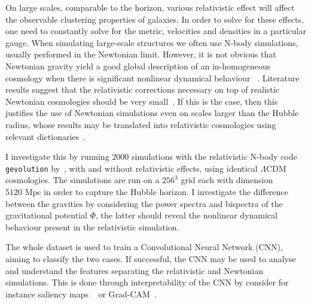 On large scales, comparable to the horizon, various relativistic effect will affect the observable clustering properties of galaxies. In order to solve for these effects, one need to constantly solve for the metric, velocities and densities in a particular gauge. When simulating large-scale structures we often use N-body simulations, usually performed in the Newtonian limit. However, it is not obvious that Newtonian gravity yield a good global description of an in-homogeneous cosmology when there is significant nonlinear dynamical behaviour ~\parencite{jeong_large-scale_2012}. Literature results suggest that the relativistic corrections necessary on top of realistic Newtonian cosmologies should be very small~\parencite{chisari_connection_2011}. If this is the case, then this justifies the use of Newtonian simulations even on scales larger than the Hubble radius, whose results may be translated into relativistic cosmologies using relevant dictionaries~\parencite{green_newtonian_2012}.

I investigate this by running 2000 simulations with the relativistic N-body code \texttt{gevolution} by~\cite{adamek_gevolution_2016}, with and without relativistic effects, using identical $\Lambda$CDM cosmologies. The simulations are run on a $256^3$ grid each with dimension $5120\text{ Mpc}$ in order to capture the Hubble horizon. I investigate the difference between the gravities by considering the power spectra and bispectra of the gravitational potential $\Phi$, the latter should reveal the nonlinear dynamical behaviour present in the relativistic simulation. 

The whole dataset is used to train a Convolutional Neural Network (CNN), aiming to classify the two cases. If successful, the CNN may be used to analyse and understand the features separating the relativistic and Newtonian simulations. This is done through interpretability of the CNN by consider for instance saliency maps ~\parencite{alqaraawi_evaluating_2020} or Grad-CAM~\parencite{selvaraju_grad-cam_2020}. 